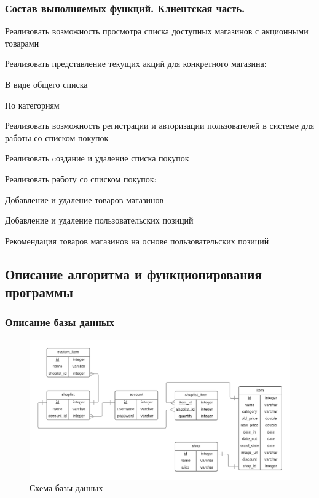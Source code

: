 \subsubsection{Состав выполняемых функций. Клиентская часть.}
\begin{my_enumerate}
  \item Реализовать возможность просмотра списка доступных магазинов с акционными товарами
  \item Реализовать представление текущих акций для конкретного магазина:
    \begin{my_enumerate}
      \item В виде общего списка
      \item По категориям
    \end{my_enumerate}
  \item Реализовать возможность регистрации и авторизации пользователей в системе для
    работы со списком покупок
  \item Реализовать cоздание и удаление списка покупок
  \item Реализовать работу со списком покупок:
    \begin{my_enumerate}
      \item Добавление и удаление товаров магазинов
      \item Добавление и удаление пользовательских позиций
      \item Рекомендация товаров магазинов на основе пользовательских позиций 
    \end{my_enumerate}
\end{my_enumerate}

\subsection{Описание алгоритма и функционирования программы}

\subsubsection{Описание базы данных}
\begin{figure}[h]
    \centering
    \includegraphics[width=\textwidth]{./pics/database.png}
    \caption{\small{Схема базы данных}}
    \label{database}
\end{figure}

